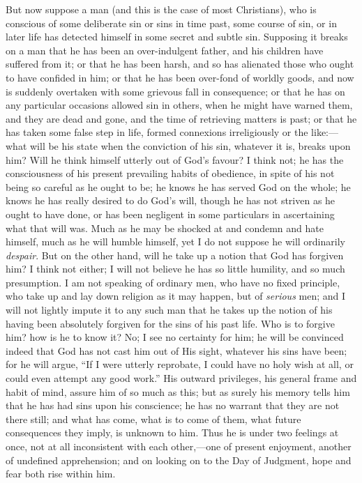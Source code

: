 But now suppose a man (and this is the case of most Christians),
who is conscious of some deliberate sin or sins in time past, some
course of sin, or in later life has detected himself in some secret
and subtle sin. Supposing it breaks on a man that he has been an
over-indulgent father, and his children have suffered from it; or that
he has been harsh, and so has alienated those who ought to have
confided in him; or that he has been over-fond of worldly goods, and
now is suddenly overtaken with some grievous fall in consequence; or
that he has on any particular occasions allowed sin in others, when he
might have warned them, and they are dead and gone, and the time of
retrieving matters is past; or that he has taken some false step in
life, formed connexions irreligiously or the like:—what will be his
state when the conviction of his sin, whatever it is, breaks upon him?
Will he think himself utterly out of God's favour? I think not; he has
the consciousness of his present prevailing habits of obedience, in
spite of his not being so careful as he ought to be; he knows he has
served God on the whole; he knows he has really desired to do God's
will, though he has not striven as he ought to have done, or has been
negligent in some particulars in ascertaining what that will was. Much
as he may be shocked at and condemn and hate himself, much as he will
humble himself, yet I do not suppose he will ordinarily \emph{despair}.
But on the other hand, will he take up a notion that God has forgiven
him? I think not either; I will not believe he has so little humility,
and so much presumption. I am not speaking of ordinary men, who have
no fixed principle, who take up and lay down religion as it may
happen, but of \emph{serious} men; and I will not lightly impute it to
any such man that he takes up the notion of his having been absolutely
forgiven for the sins of his past life. Who is to forgive him? how is
he to know it? No; I see no certainty for him; he will be convinced
indeed that God has not cast him out of His sight, whatever his sins
have been; for he will argue, ``If I were utterly reprobate, I
could have no holy wish at all, or could even attempt any good
work.'' His outward privileges, his general frame and habit of
mind, assure him of so much as this; but as surely his memory tells
him that he has had sins upon his conscience; he has no warrant that
they are not there still; and what has come, what is to come of them,
what future consequences they imply, is unknown to him. Thus he is
under two feelings at once, not at all inconsistent with each other,—one
of present enjoyment, another of undefined apprehension; and on
looking on to the Day of Judgment, hope and fear both rise within him.

